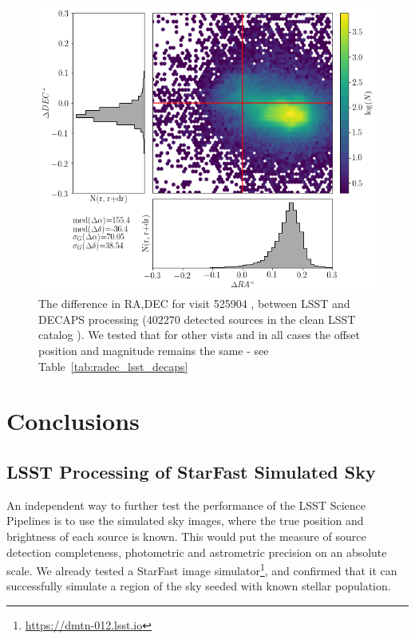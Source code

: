 \documentclass[DM,lsstdraft,toc,usenatbib]{lsstdoc}
\begin{document}
\begin{figure}
\begin{centering}
\includegraphics[width=0.8\columnwidth]{figs/22_525904_RA_DEC_offset.png}
\caption{The difference in RA,DEC for visit 525904 , between LSST and DECAPS processing (402270 detected sources in  the clean LSST catalog ). We tested that for other vists and in all cases the offset position and magnitude remains the same - see Table~\ref{tab:radec_lsst_decaps}}
\label{fig:ra_dec_lsst_decaps}
\end{centering}
\end{figure} 




\section{Conclusions}
\label{sec:conclusions}


\subsection{LSST Processing of StarFast Simulated Sky}
An independent way to further test the performance of the LSST Science Pipelines is to use the simulated sky images, where the true position and  brightness of each source is known. This would put the measure of source detection completeness, photometric and astrometric precision on an absolute scale. We already tested a StarFast image simulator\footnote{\url{https://dmtn-012.lsst.io}}, and confirmed that it can successfully simulate a region of the sky seeded with known stellar population.  
\end{document}
